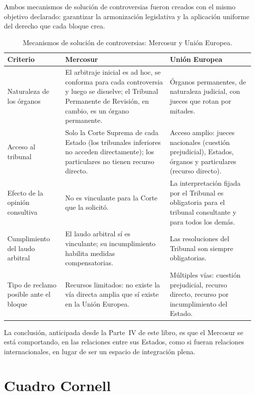 \documentclass[12pt,oneside]{book}
\begin{document}
Ambos mecanismos de solución de controversias fueron creados con el mismo objetivo declarado: garantizar la armonización legislativa y la aplicación uniforme del derecho que cada bloque crea.

\begin{table}[H]
\centering
\renewcommand{\arraystretch}{1.25}
\begin{tabularx}{\textwidth}{>{\raggedright\arraybackslash}p{}>{\raggedright\arraybackslash}X>{\raggedright\arraybackslash}X}
\toprule
\textbf{Criterio} & \textbf{Mercosur} & \textbf{Unión Europea} \\
\midrule
Naturaleza de los órganos & El arbitraje inicial es ad hoc, se conforma para cada controversia y luego se disuelve; el Tribunal Permanente de Revisión, en cambio, es un órgano permanente. & Órganos permanentes, de naturaleza judicial, con jueces que rotan por mitades. \\
Acceso al tribunal & Solo la Corte Suprema de cada Estado (los tribunales inferiores no acceden directamente); los particulares no tienen recurso directo. & Acceso amplio: jueces nacionales (cuestión prejudicial), Estados, órganos y particulares (recurso directo). \\
Efecto de la opinión consultiva & No es vinculante para la Corte que la solicitó. & La interpretación fijada por el Tribunal es obligatoria para el tribunal consultante y para todos los demás. \\
Cumplimiento del laudo arbitral & El laudo arbitral sí es vinculante; su incumplimiento habilita medidas compensatorias. & Las resoluciones del Tribunal son siempre obligatorias. \\
Tipo de reclamo posible ante el bloque & Recursos limitados: no existe la vía directa amplia que sí existe en la Unión Europea. & Múltiples vías: cuestión prejudicial, recurso directo, recurso por incumplimiento del Estado. \\
\bottomrule
\end{tabularx}
\caption{Mecanismos de solución de controversias: Mercosur y Unión Europea.}
\end{table}

La conclusión, anticipada desde la Parte~IV de este libro, es que el Mercosur se está comportando, en las relaciones entre sus Estados, como si fueran relaciones internacionales, en lugar de ser un espacio de integración plena.

\section{Cuadro Cornell}
\end{document}
